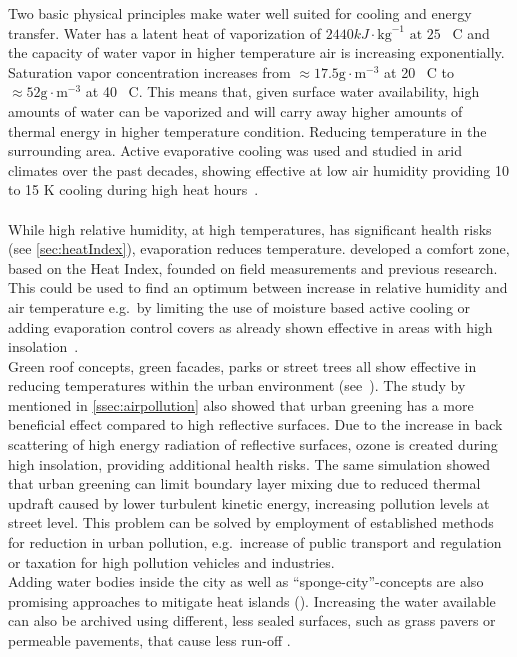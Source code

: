 \documentclass[12pt,a4paper, english,twoside]{scrartcl}
\begin{document}
      Two basic physical principles make water well suited for cooling and energy transfer.
      Water has a latent heat of vaporization of $2440 kJ\cdot \text{kg}^{-1} \text{ at } 25$ \textdegree\ C and the capacity of water vapor in higher temperature air is increasing exponentially.
      Saturation vapor concentration increases from $\approx17.5 \text{g}\cdot \text{m}^{-3}$ at 20 \textdegree\ C  to $\approx 52 \text{g}\cdot \text{m}^{-3}$ at 40 \textdegree\ C.
      This means that, given surface water availability, high amounts of water can be vaporized and will carry away higher amounts of thermal energy in higher temperature condition.
      Reducing temperature in the surrounding area. 
      Active evaporative cooling was used and studied in arid climates over the past decades, showing effective at low air humidity providing 10 to 15 K cooling during high heat hours~\autocite{Vanos2022}.\\ \\
      While high relative humidity, at high temperatures, has significant health risks (see \cref{sec:heatIndex}), evaporation reduces temperature.
      \Cite{Pontes2022} developed a comfort zone, based on the Heat Index, founded on field measurements and previous research. 
      This could be used to find an optimum between increase in relative humidity and air temperature e.g.\ by limiting the use of moisture based active cooling or adding evaporation control covers as already shown effective in areas with high insolation~\cite{Ghazvinian2021}.\\
      Green roof concepts, green facades, parks or street trees all show effective in reducing temperatures within the urban environment (see~\cite{Ramamurthy2014, Feyisa2014, Dimoudi2003, Gartland2008}).
      The study by~\cite{Fallmann2016} mentioned in \cref{ssec:airpollution} also showed that urban greening has a more beneficial effect compared to high reflective surfaces. 
      Due to the increase in back scattering of high energy radiation of reflective surfaces, ozone is created during high insolation, providing additional health risks.
      The same simulation showed that urban greening can limit boundary layer mixing due to reduced thermal updraft caused by lower turbulent kinetic energy, increasing pollution levels at street level.
      This problem can be solved by employment of established methods for reduction in urban pollution, e.g.\ increase of public transport and regulation or taxation for high pollution vehicles and industries. \\
      Adding water bodies inside the city as well as ``sponge-city''-concepts are also promising approaches to mitigate heat islands (\cite{He2019}).
      Increasing the water available can also be archived using different, less sealed surfaces, such as grass pavers or permeable pavements, that cause less run-off \autocite[p. 7]{EPA2008}.
\end{document}
